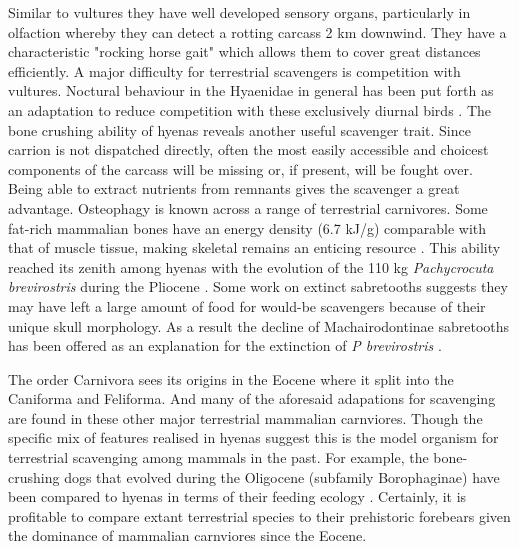 \documentclass[a4paper,12pt]{article}
\begin{document}
Similar to vultures they have well developed sensory organs, particularly in olfaction whereby they can detect a rotting carcass 2 km downwind. They have a characteristic "rocking horse gait"  which allows them to cover great distances efficiently. A major difficulty for terrestrial scavengers is competition with vultures. Noctural behaviour in the Hyaenidae in general has been put forth as an adaptation to reduce competition with these exclusively diurnal birds \citep{gittleman2013carnivore}. The bone crushing ability of hyenas reveals another useful scavenger trait. Since carrion is not dispatched directly, often the most easily accessible and choicest components of the carcass will be missing or, if present, will be fought over. Being able to extract nutrients from remnants gives the scavenger a great advantage. Osteophagy is known across a range of terrestrial carnivores. Some fat-rich mammalian bones have an energy density (6.7 kJ/g) comparable with that of muscle tissue, making skeletal remains an enticing resource \citep{brown1989study}. This ability reached its zenith among hyenas with the evolution of the 110 kg \textit{Pachycrocuta brevirostris} during the Pliocene \citep{palmqvist2011giant}. Some work on extinct sabretooths suggests they may have left a large amount of food for would-be scavengers because of their unique skull morphology. As a result the decline of Machairodontinae sabretooths has been offered as an explanation for the extinction of \textit{P brevirostris} \citep{palmqvist2011giant}. 

The order Carnivora sees its origins in the Eocene where it split into the Caniforma and Feliforma. And many of the aforesaid adapations for scavenging are found in these other major terrestrial mammalian carnviores. Though the specific mix of features realised in hyenas suggest this is the model organism for terrestrial scavenging among mammals in the past. For example, the bone-crushing dogs that evolved during the Oligocene (subfamily Borophaginae) have been compared to hyenas in terms of their feeding ecology \citep{van2003chapter,martin2016pursuit}. Certainly, it is profitable to compare extant terrestrial species to their prehistoric forebears given the dominance of mammalian carnviores since the Eocene.  
\end{document}
